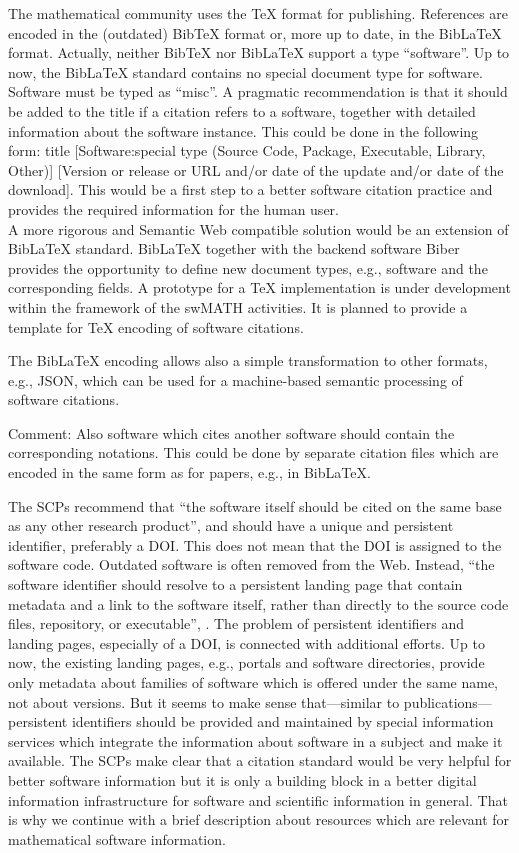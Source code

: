 \documentclass[a4paper,11pt]{article}
\begin{document}
\begin{multicols}{2}
The mathematical community uses the {\TeX} format for publishing. References are encoded in the (outdated) Bib{\TeX} format or, more up to date, in the  Bib{\LaTeX} format. Actually, neither Bib{\TeX} nor Bib{\LaTeX}  support a type ``software''. Up to now, the Bib{\LaTeX} standard contains no special document type for software. Software must be typed as ``misc''. A pragmatic recommendation is that it should be added to the title if a citation refers to a software, together with detailed information about the software instance. This could be done in the following form: title [Software:special type (Source Code, Package, Executable, Library, Other)] [Version or release or URL and/or date of the update and/or date of the download]. This would be a first step to a better software citation practice and provides the required information for the human user.\\
A more rigorous and Semantic Web compatible solution would be an extension of Bib{\LaTeX} standard. Bib{\LaTeX} together with the backend software Biber provides the opportunity to define new document types, e.g., software and the corresponding fields.  A prototype for a {\TeX} implementation is under development within the framework of the swMATH activities. It is planned to provide a template for  {\TeX} encoding of software citations.

The Bib{\LaTeX} encoding allows also a simple transformation to other formats, e.g., JSON, which can be used for a machine-based semantic processing of software citations.

Comment: Also software which cites another software should contain the corresponding notations. This could be done by separate citation files which are  encoded in the same form as for papers, e.g., in Bib\LaTeX.

The SCPs recommend that ``the software itself should be cited on the same base as any other research product'', and should have a unique and persistent identifier, preferably a DOI. This does not mean that the DOI is assigned to the software code. Outdated software is often removed from the Web. Instead, ``the software identifier should resolve to a persistent landing page that contain metadata and a link to the software itself, rather than directly to the source code files, repository, or executable'', \cite{SoftwareCitationPrinciples}.  The problem of persistent identifiers and landing pages, especially of a DOI, is connected with additional efforts. Up to now, the existing landing pages, e.g.,  portals and software directories, provide only metadata about families of software which is offered under the same name, not about versions. But it seems to make sense that---similar to publications---persistent identifiers should be provided and maintained by special information services which integrate the information about software in a subject and make it available.
The SCPs make clear that a citation standard would be very helpful for better software information but it is only a building block in a better digital information infrastructure for software and scientific information in general. That is why we continue with a brief description about resources which are relevant for mathematical software information.


\end{multicols}
\end{document}
